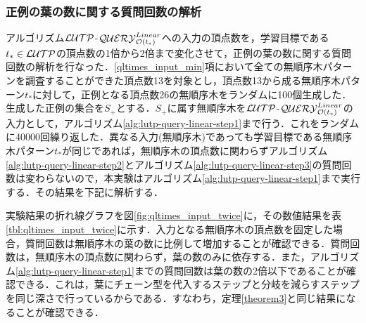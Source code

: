 \subsubsection{正例の葉の数に関する質問回数の解析}
アルゴリズム${\cal LUTP}$-${\cal QUERY}_{{\cal O}(t_{\ast})}^{Linear}$への入力の頂点数を，学習目標である$t_\ast\in{\cal LUTP}$の頂点数の1倍から2倍まで変化させて，正例の葉の数に関する質問回数の解析を行なった．\ref{qltimes_input_min}項において全ての無順序木パターンを調査することができた頂点数13を対象とし，頂点数13から成る無順序木パターン$t_\ast$に対して，正例となる頂点数26の無順序木をランダムに100個生成した．生成した正例の集合を$S_+$とする．$S_+$に属す無順序木を${\cal LUTP}$-${\cal QUERY}_{{\cal O}(t_{\ast})}^{Linear}$の入力として，アルゴリズム\ref{alg:lutp-query-linear-step1}まで行う．これをランダムに40000回繰り返した．異なる入力(無順序木)であっても学習目標である無順序木パターン$t_\ast$が同じであれば，無順序木の頂点数に関わらずアルゴリズム\ref{alg:lutp-query-linear-step2}とアルゴリズム\ref{alg:lutp-query-linear-step3}の質問回数は変わらないので，本実験はアルゴリズム\ref{alg:lutp-query-linear-step1}まで実行する．その結果を下記に解析する．

実験結果の折れ線グラフを図\ref{fig:qltimes_input_twice}に，その数値結果を表\ref{tbl:qltimes_input_twice}に示す．入力となる無順序木の頂点数を固定した場合，質問回数は無順序木の葉の数に比例して増加することが確認できる．質問回数は，無順序木の頂点数に関わらず，葉の数のみに依存する．また，アルゴリズム\ref{alg:lutp-query-linear-step1}までの質問回数は葉の数の2倍以下であることが確認できる．これは，葉にチェーン型を代入するステップと分岐を減らすステップを同じ深さで行っているからである．すなわち，定理\ref{theorem3}と同じ結果になることが確認できる．

